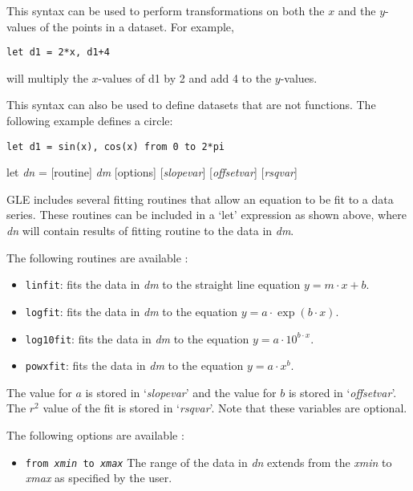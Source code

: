 \begin{commanddescription}
This syntax can be used to perform transformations on both the $x$ and the $y$-values of the points in a dataset. For example,

\begin{Verbatim}
let d1 = 2*x, d1+4
\end{Verbatim}

will multiply the $x$-values of d1 by 2 and add 4 to the $y$-values. 

This syntax can also be used to define datasets that are not functions. The following example defines a circle:

\begin{Verbatim}
let d1 = sin(x), cos(x) from 0 to 2*pi
\end{Verbatim}

\item[{\sf let {\it dn} = [routine] {\it dm} [options] [{\it slopevar}] [{\it offsetvar}] [{\it rsqvar}]}]

GLE includes several fitting routines that allow an equation to be fit to a data series. These routines can be included in a `let' expression as shown above, where {\it dn} will contain results of fitting {\sf routine} to the data in {\it dm}.

The following routines are available :
\begin{itemize}
\item \texttt{linfit}: fits the data in \textit{dm} to the straight line equation $y = m \cdot x + b$.
\item \texttt{logfit}: fits the data in \textit{dm} to the equation $y = a \cdot \exp(b \cdot x)$.
\item \texttt{log10fit}: fits the data in \textit{dm} to the equation $y = a \cdot 10^{b \cdot x}$.
\item \texttt{powxfit}: fits the data in \textit{dm} to the equation $y = a \cdot x^b$.
\end{itemize}

The value for $a$ is stored in `{\it slopevar}' and the value for $b$ is stored in `{\it offsetvar}'. The $r^2$ value of the fit is stored in `{\it rsqvar}'. Note that these variables are optional.

The following options are available :
\begin{itemize}
\item \texttt{from {\it xmin} to {\it xmax}} The range of the data in \textit{dn} extends from the \textit{xmin} to \textit{xmax} as specified by the user.


\end{itemize}
\end{commanddescription}

